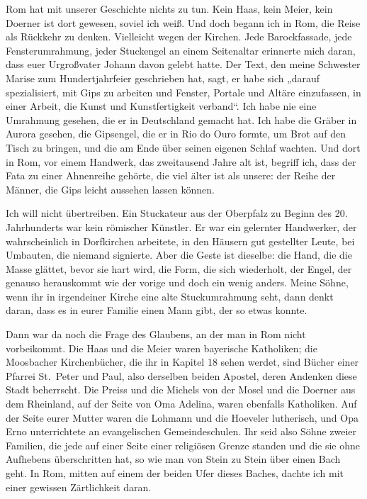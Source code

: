 \documentclass[
  ngerman,
  11pt,
  openany]{book}
\begin{document}
Rom hat mit unserer Geschichte nichts zu tun. Kein Haas, kein Meier,
kein Doerner ist dort gewesen, soviel ich weiß. Und doch begann ich in
Rom, die Reise als Rückkehr zu denken. Vielleicht wegen der Kirchen.
Jede Barockfassade, jede Fensterumrahmung, jeder Stuckengel an einem
Seitenaltar erinnerte mich daran, dass euer Urgroßvater Johann davon
gelebt hatte. Der Text, den meine Schwester Marise zum Hundertjahrfeier
geschrieben hat, sagt, er habe sich „darauf spezialisiert, mit Gips zu
arbeiten und Fenster, Portale und Altäre einzufassen, in einer Arbeit,
die Kunst und Kunstfertigkeit verband``. Ich habe nie eine Umrahmung
gesehen, die er in Deutschland gemacht hat. Ich habe die Gräber in
Aurora gesehen, die Gipsengel, die er in Rio do Ouro formte, um Brot auf
den Tisch zu bringen, und die am Ende über seinen eigenen Schlaf
wachten. Und dort in Rom, vor einem Handwerk, das zweitausend Jahre alt
ist, begriff ich, dass der Fata zu einer Ahnenreihe gehörte, die viel
älter ist als unsere: der Reihe der Männer, die Gips leicht aussehen
lassen können.

Ich will nicht übertreiben. Ein Stuckateur aus der Oberpfalz zu Beginn
des 20. Jahrhunderts war kein römischer Künstler. Er war ein gelernter
Handwerker, der wahrscheinlich in Dorfkirchen arbeitete, in den Häusern
gut gestellter Leute, bei Umbauten, die niemand signierte. Aber die
Geste ist dieselbe: die Hand, die die Masse glättet, bevor sie hart
wird, die Form, die sich wiederholt, der Engel, der genauso herauskommt
wie der vorige und doch ein wenig anders. Meine Söhne, wenn ihr in
irgendeiner Kirche eine alte Stuckumrahmung seht, dann denkt daran, dass
es in eurer Familie einen Mann gibt, der so etwas konnte.

Dann war da noch die Frage des Glaubens, an der man in Rom nicht
vorbeikommt. Die Haas und die Meier waren bayerische Katholiken; die
Moosbacher Kirchenbücher, die ihr in Kapitel 18 sehen werdet, sind
Bücher einer Pfarrei St.~Peter und Paul, also derselben beiden Apostel,
deren Andenken diese Stadt beherrscht. Die Preiss und die Michels von
der Mosel und die Doerner aus dem Rheinland, auf der Seite von Oma
Adelina, waren ebenfalls Katholiken. Auf der Seite eurer Mutter waren
die Lohmann und die Hoeveler lutherisch, und Opa Erno unterrichtete an
evangelischen Gemeindeschulen. Ihr seid also Söhne zweier Familien, die
jede auf einer Seite einer religiösen Grenze standen und die sie ohne
Aufhebens überschritten hat, so wie man von Stein zu Stein über einen
Bach geht. In Rom, mitten auf einem der beiden Ufer dieses Baches,
dachte ich mit einer gewissen Zärtlichkeit daran.
\end{document}
